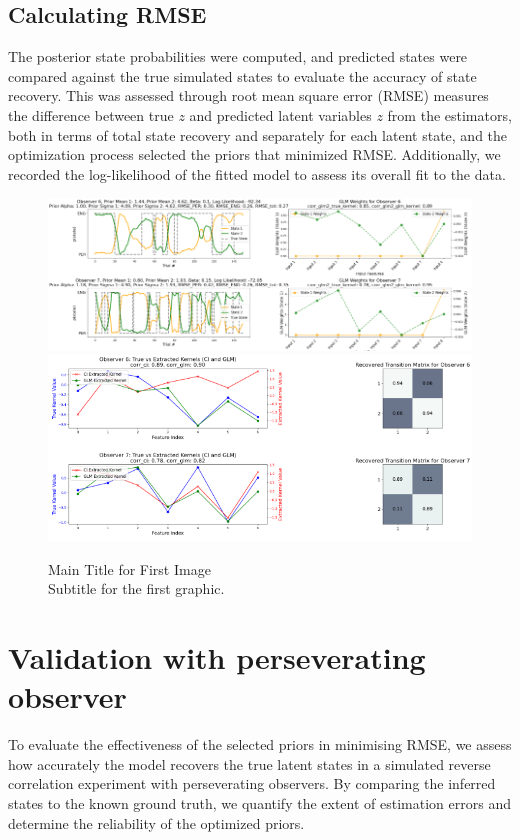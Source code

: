 \subsection{Calculating RMSE}
The posterior state probabilities were computed, and predicted states were compared against the true simulated states to evaluate the accuracy of state recovery. This was assessed through root mean square error (RMSE) measures the difference between true $z$ and predicted latent variables $z$ from the estimators, both in terms of total state recovery and separately for each latent state, and the optimization process selected the priors that minimized RMSE. Additionally, we recorded the log-likelihood of the fitted model to assess its overall fit to the data.
\begin{figure}[H]
    \centering
    \includegraphics[width=16cm]{MainLayout/Images/chapter7/bo_glmhmm.png}
    \includegraphics[width=16cm]{MainLayout/Images/chapter7/bo_glmhmm1.png}
    \caption{Main Title for First Image \\ \small Subtitle for the first graphic.}
    \label{fig:bo_glmhmm}
\end{figure}

\section{Validation with perseverating observer}
To evaluate the effectiveness of the selected priors in minimising RMSE, we assess how accurately the model recovers the true latent states in a simulated reverse correlation experiment with perseverating observers. By comparing the inferred states to the known ground truth, we quantify the extent of estimation errors and determine the reliability of the optimized priors.


